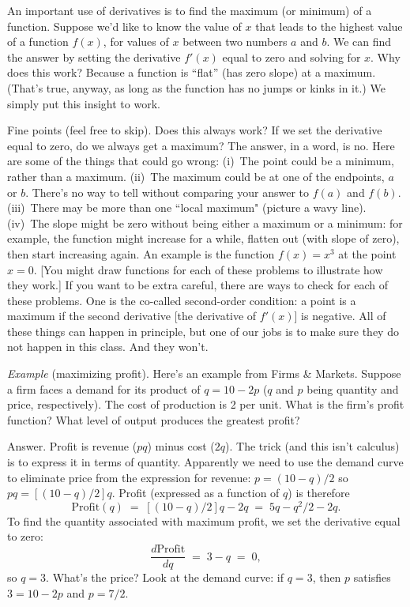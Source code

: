 \documentclass[letterpaper,12pt]{article}
\begin{document}
An important use of derivatives is to find the maximum (or minimum) of a function.
Suppose we'd like to know the value of $x$
that leads to the highest value of a function $f(x)$,
for values of $x$ between two numbers $a$ and $b$.
We can find the answer by setting the derivative $f'(x)$ equal to zero and solving for $x$.
Why does this work?
Because a function is ``flat'' (has zero slope) at a maximum.
(That's true, anyway, as long as the function has no jumps or kinks in it.)
We simply put this insight to work.


Fine points (feel free to skip).  Does this always work?
If we set the derivative equal to zero, do we always get a maximum?  The answer, in a word, is no.
Here are some of the things that could go wrong:
(i)~The point could be a minimum, rather than a maximum.
(ii)~The maximum could be at one of the endpoints, $a$ or $b$.
There's no way to tell without comparing your answer to $f(a)$ and
$f(b)$. (iii)~There may be more than one ``local maximum" (picture
a wavy line). (iv)~The slope might be zero without being either a
maximum or a minimum: for example, the function might increase for
a while, flatten out (with slope of zero), then start increasing
again. An example is the function $f(x) = x^3$ at the point $x=0$.
[You might draw functions for each of these problems to illustrate
how they work.]
If you want to be extra careful, there are ways to check for each of these problems.
One is the co-called second-order condition:  a point is a maximum if the second derivative
[the derivative of $f'(x)$] is negative.
All of these things can happen in principle,
but one of our jobs is to make sure they do not happen in this class.
And they won't.


{\it Example} (maximizing profit).
Here's an example from Firms \& Markets.
Suppose a firm faces a demand for its product of $q = 10 - 2p$
($q$ and $p$ being quantity and price, respectively).
The cost of production is 2 per unit.
What is the firm's profit function?
What level of output produces the greatest profit?

Answer.  Profit is revenue ($pq$) minus cost ($2q$). The trick
(and this isn't calculus) is to express it in terms of quantity.
Apparently we need to use the demand curve to eliminate price from
the expression for revenue: $p = (10-q)/2$ so $pq = [(10-q)/2]q$.
Profit (expressed as a function of $q$) is therefore
\[
    \mbox{Profit}(q) \;=\; [(10-q)/2]q - 2q \;=\; 5q - q^2/2 - 2q.
\]
To find the quantity associated with maximum profit, we set the derivative equal to zero:
\[
    \frac{d\mbox{Profit}}{dq} \;=\; 3 - q \;=\; 0,
\]
so $q = 3$.  What's the price?
Look at the demand curve:  if $q = 3$, then $p$ satisfies $3 = 10-2p$ and $p = 7/2$.
\end{document}

